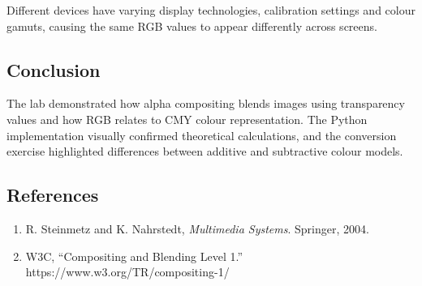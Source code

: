\documentclass[12pt,a4paper]{article}
\begin{document}
Different devices have varying display technologies, calibration settings and colour gamuts, causing the same RGB values to appear differently across screens.

\subsection{Conclusion}

The lab demonstrated how alpha compositing blends images using transparency values and how RGB relates to CMY colour representation. The Python implementation visually confirmed theoretical calculations, and the conversion exercise highlighted differences between additive and subtractive colour models.

\subsection{References}

\begin{enumerate}
    \item R. Steinmetz and K. Nahrstedt, \textit{Multimedia Systems}. Springer, 2004.
    \item W3C, ``Compositing and Blending Level 1.'' https://www.w3.org/TR/compositing-1/
\end{enumerate}
\end{document}
